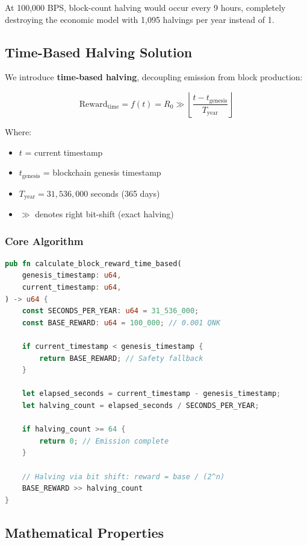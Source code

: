 \documentclass[11pt,a4paper]{article}
\begin{document}
At 100,000 BPS, block-count halving would occur every 9 hours, completely destroying the economic model with 1,095 halvings per year instead of 1.

\subsection{Time-Based Halving Solution}

We introduce \textbf{time-based halving}, decoupling emission from block production:

\begin{equation}
\text{Reward}_{\text{time}} = f(t) = R_0 \gg \left\lfloor \frac{t - t_{\text{genesis}}}{T_{\text{year}}} \right\rfloor
\end{equation}

Where:
\begin{itemize}
    \item $t$ = current timestamp
    \item $t_{\text{genesis}}$ = blockchain genesis timestamp
    \item $T_{\text{year}} = 31,536,000$ seconds (365 days)
    \item $\gg$ denotes right bit-shift (exact halving)
\end{itemize}

\subsubsection{Core Algorithm}

\begin{lstlisting}[language=Rust, caption=Time-Based Halving Implementation]
pub fn calculate_block_reward_time_based(
    genesis_timestamp: u64,
    current_timestamp: u64,
) -> u64 {
    const SECONDS_PER_YEAR: u64 = 31_536_000;
    const BASE_REWARD: u64 = 100_000; // 0.001 QNK

    if current_timestamp < genesis_timestamp {
        return BASE_REWARD; // Safety fallback
    }

    let elapsed_seconds = current_timestamp - genesis_timestamp;
    let halving_count = elapsed_seconds / SECONDS_PER_YEAR;

    if halving_count >= 64 {
        return 0; // Emission complete
    }

    // Halving via bit shift: reward = base / (2^n)
    BASE_REWARD >> halving_count
}
\end{lstlisting}

\subsection{Mathematical Properties}
\end{document}
